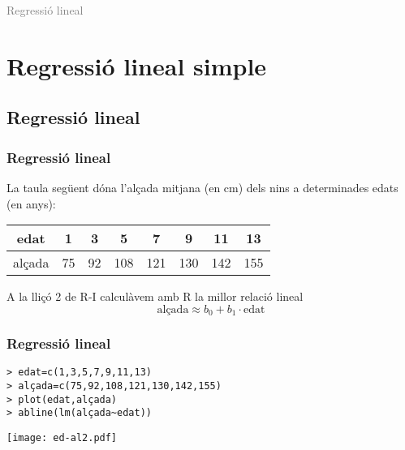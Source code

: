 \documentclass[12pt,t]{beamer}
\title[\red{Matemàtiques III}]{}
\author[]{}
\date{}
\newcommand{\gray}[1]{\textcolor{gray}{#1}}
\theoremstyle{plain}
\theoremstyle{definition}
\begin{document}
\beamertemplatedotitem

\lstset{breaklines=true}
\lstset{basicstyle=\ttfamily}


\begin{frame}
\vfill
\begin{center}
\gray{\LARGE Regressió lineal}
\end{center}
\vfill
\end{frame}



\section{Regressió lineal simple}
\subsection{Regressió lineal}

\begin{frame}
\frametitle{Regressió lineal}

La taula següent dóna l'alçada mitjana (en cm) dels nins a determinades edats (en anys):
\begin{center}
\begin{tabular}{c|ccccccc}
\hline
edat & 1 & 3 & 5 & 7 & 9 & 11 & 13\\
\hline
alçada & 75 & 92 & 108 & 121 & 130 & 142 & 155\\
\hline
\end{tabular}
\end{center}
A la lliçó 2 de R-I calculàvem amb R la millor relació lineal
$$
\mbox{alçada}\approx b_0+b_1\cdot\mbox{edat}
$$ 
\end{frame}



\begin{frame}[fragile]
\frametitle{Regressió lineal}
\vspace*{-2ex}

\begin{verbatim}
> edat=c(1,3,5,7,9,11,13)
> alçada=c(75,92,108,121,130,142,155)
> plot(edat,alçada)
> abline(lm(alçada~edat))
\end{verbatim}
\vspace*{-4ex}

\begin{center}
\texttt{[image: ed-al2.pdf]}
\end{center}
\end{frame}
\end{document}
